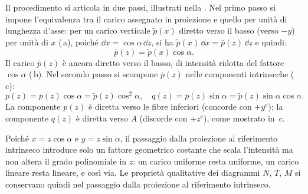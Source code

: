 



Il procedimento si articola in due passi,
illustrati nella
.
Nel primo passo si impone l'equivalenza tra
il carico assegnato in proiezione e quello
per unità di lunghezza d'asse: per un carico
verticale $\tilde{p}(x)$ diretto verso il
basso (verso $-y$) per unità di $x$
(\,a),
poiché $\dd x = \cos\alpha\,\dd z$, si ha
$\tilde{p}(x)\,\dd x = \bar{p}(z)\,\dd z$ e quindi:
\[
\bar{p}(z) = \tilde{p}(x)\cos\alpha.
\]
Il carico $\bar{p}(z)$ è ancora diretto verso
il basso, di intensità ridotta del fattore
$\cos\alpha$
(\,b).
Nel secondo passo si scompone $\bar{p}(z)$
nelle componenti intrinseche
(\,c):
\begin{equation}
	p(z) = \bar{p}(z)\cos\alpha= \tilde{p}(z)\cos^2\alpha, \quad
	q(z) = \bar{p}(z)\sin\alpha= \tilde{p}(z)\sin\alpha\cos\alpha.
\end{equation}
La componente $p(z)$ è diretta verso le fibre
inferiori (concorde con $+y^e$); la componente
$q(z)$ è diretta verso $A$ (discorde con
$+z^e$), come mostrato in
\,c.

Poiché $x = z\cos\alpha$ e $y = z\sin\alpha$,
il passaggio dalla proiezione al riferimento
intrinseco introduce solo un fattore geometrico
costante che scala l'intensità ma non altera
il grado polinomiale in $z$: un carico
uniforme resta uniforme, un carico lineare
resta lineare, e così via. Le proprietà
qualitative dei diagrammi $N$, $T$, $M$ si
conservano quindi nel passaggio dalla
proiezione al riferimento intrinseco.




